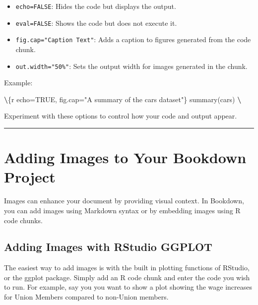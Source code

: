 \documentclass[
]{book}
\newenvironment{Shaded}{\begin{snugshade}}{\end{snugshade}}
\newcommand{\NormalTok}[1]{#1}
\newcommand{\SpecialCharTok}[1]{\textcolor[rgb]{0.81,0.36,0.00}{\textbf{#1}}}
\providecommand{\tightlist}{%
  \setlength{\itemsep}{0pt}\setlength{\parskip}{0pt}}
\theoremstyle{definition}
\theoremstyle{definition}
\theoremstyle{definition}
\theoremstyle{definition}
\theoremstyle{remark}
\begin{document}
\begin{itemize}
\tightlist
\item
  \texttt{echo=FALSE}: Hides the code but displays the output.
\item
  \texttt{eval=FALSE}: Shows the code but does not execute it.
\item
  \texttt{fig.cap="Caption\ Text"}: Adds a caption to figures generated from the code chunk.
\item
  \texttt{out.width="50\%"}: Sets the output width for images generated in the chunk.
\end{itemize}

Example:

\begin{Shaded}
\begin{Highlighting}[]
\SpecialCharTok{\textbackslash{}\textasciigrave{}}\NormalTok{\textasciigrave{}\textasciigrave{}\{r echo=TRUE, fig.cap="A summary of the cars dataset"\}}
\NormalTok{summary(cars)}
\SpecialCharTok{\textbackslash{}\textasciigrave{}}\NormalTok{\textasciigrave{}\textasciigrave{}}
\end{Highlighting}
\end{Shaded}

Experiment with these options to control how your code and output appear.

\begin{center}\rule{0.5\linewidth}{0.5pt}\end{center}

\section{Adding Images to Your Bookdown Project}\label{adding-images-to-your-bookdown-project}

Images can enhance your document by providing visual context. In Bookdown, you can add images using Markdown syntax or by embedding images using R code chunks.

\subsection{Adding Images with RStudio GGPLOT}\label{adding-images-with-rstudio-ggplot}

The easiest way to add images is with the built in plotting functions of RStudio, or the ggplot package. Simply add an R code chunk and enter the code you wish to run. For example, say you you want to show a plot showing the wage increases for Union Members compared to non-Union members.
\end{document}

